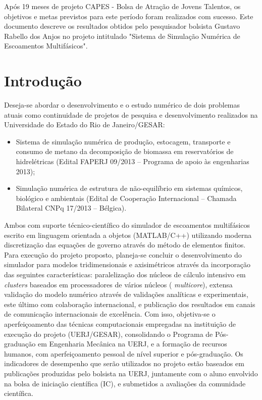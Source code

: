 \documentclass[a4paper,portuges,12pt]{article}
\begin{document}
Após 19 meses de projeto CAPES - Bolsa de Atração de Jovens
Talentos, os objetivos e metas previstos para este período foram
realizados com sucesso. Este documento descreve os resultados obtidos
pelo pesquisador bolsista Gustavo Rabello dos Anjos no projeto
intitulado "Sistema de Simulação Numérica de Escoamentos Multifásicos". 
\clearpage

\section{Introdução}

Deseja-se abordar o desenvolvimento e o estudo numérico de dois
problemas atuais como continuidade de projetos de pesquisa e
desenvolvimento realizados na Universidade do Estado do Rio de
Janeiro/GESAR: 

\begin{itemize}
\item Sistema de simulação numérica de produção, estocagem,
transporte e consumo de metano da decomposição de biomassa em
reservatórios de hidrelétricas (Edital FAPERJ 09/2013 – Programa de
apoio às engenharias 2013); 
\item Simulação numérica de estrutura de
não-equilíbrio em sistemas químicos, biológico e ambientais (Edital de
Cooperação Internacional – Chamada Bilateral CNPq 17/2013 – Bélgica).
\end{itemize}

Ambos com suporte técnico-científico do simulador de escoamentos
multifásicos escrito em linguagem orientada a objetos (MATLAB/C++)
utilizando moderna discretização das equações de governo através do
método de elementos finitos. Para execução do projeto proposto,
planeja-se concluir o desenvolvimento do simulador para modelos
tridimensionais e axisimétricos através da incorporação das seguintes
características: paralelização dos núcleos de cálculo intensivo em
\textit{clusters} baseados em processadores de vários núcleos (
\textit{multicore}), extensa validação do modelo numérico através de
validações analíticas e experimentais, este último com colaboração
internacional, e publicação dos resultados em canais de comunicação
internacionais de excelência. Com isso, objetiva-se o aperfeiçoamento
das técnicas computacionais empregadas na instituição de execução do
projeto (UERJ/GESAR), consolidando o Programa de Pós-graduação em
Engenharia Mecânica na UERJ, e a formação de recursos humanos, com
aperfeiçoamento pessoal de nível superior e pós-graduação. Os
indicadores de desempenho que serão utilizados no projeto estão baseados
em publicações produzidas pelo bolsista na UERJ, juntamente com o aluno
envolvido na bolsa de iniciação científica (IC), e submetidos a
avaliações da comunidade científica.
\end{document}
